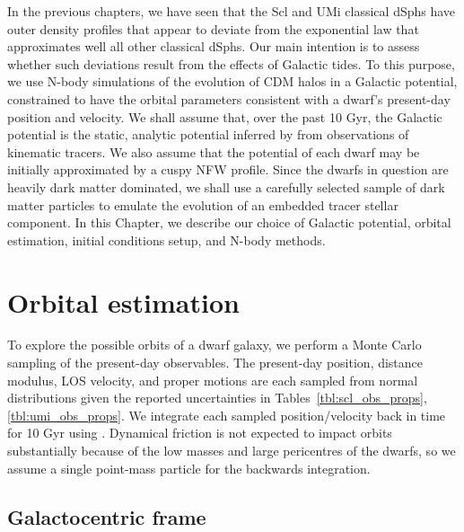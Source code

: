 In the previous chapters, we have seen that the Scl and UMi classical
dSphs have outer density profiles that appear to deviate from the
exponential law that approximates well all other classical dSphs. Our
main intention is to assess whether such deviations result from the
effects of Galactic tides. To this purpose, we use N-body simulations of
the evolution of CDM halos in a Galactic potential, constrained to have
the orbital parameters consistent with a dwarf's present-day position
and velocity. We shall assume that, over the past 10 Gyr, the Galactic
potential is the static, analytic potential inferred by
\citet{mcmillan2011} from observations of kinematic tracers. We also
assume that the potential of each dwarf may be initially approximated by
a cuspy NFW profile. Since the dwarfs in question are heavily dark
matter dominated, we shall use a carefully selected sample of dark
matter particles to emulate the evolution of an embedded tracer stellar
component. In this Chapter, we describe our choice of Galactic
potential, orbital estimation, initial conditions setup, and N-body
methods.

\section{Orbital estimation}\label{sec:orbital_estimation}

To explore the possible orbits of a dwarf galaxy, we perform a Monte
Carlo sampling of the present-day observables. The present-day position,
distance modulus, LOS velocity, and proper motions are each sampled from
normal distributions given the reported uncertainties in
Tables~\ref{tbl:scl_obs_props}, \ref{tbl:umi_obs_props}. We integrate
each sampled position/velocity back in time for 10 Gyr using \agama{}
\citep{agama}. Dynamical friction is not expected to impact orbits
substantially because of the low masses and large pericentres of the
dwarfs, so we assume a single point-mass particle for the backwards
integration.

\subsection{Galactocentric frame}\label{galactocentric-frame}

